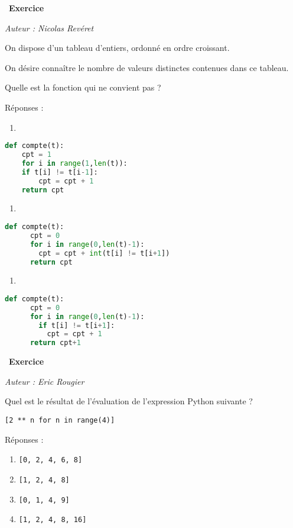 \documentclass[
  11pt,
]{article}
\newcommand{\passthrough}[1]{#1}
\providecommand{\tightlist}{%
  \setlength{\itemsep}{0pt}\setlength{\parskip}{0pt}}
\newcounter{exo}
\newenvironment{exercice}[1]
{\par \medskip   \addtocounter{exo}{1} \noindent  
\begin{bclogo}[arrondi =0.1,   noborder = true, logo=\bccrayon, marge=4]{~\textbf{Exercice} \textbf{\theexo} {\itshape #1} }  \par}
{
\end{bclogo}
 \par \bigskip }
\newcounter{def}
\begin{document}
\begin{exercice}{}

\emph{Auteur : Nicolas Revéret}

On dispose d'un tableau d'entiers, ordonné en ordre croissant.

On désire connaître le nombre de valeurs distinctes contenues dans ce
tableau.

Quelle est la fonction qui ne convient pas ?

Réponses :

\begin{enumerate}
\def\labelenumi{\Alph{enumi})}
\tightlist
\item
\end{enumerate}

\begin{lstlisting}[language=Python]
def compte(t):
    cpt = 1
    for i in range(1,len(t)):
    if t[i] != t[i-1]:
        cpt = cpt + 1
    return cpt
\end{lstlisting}

\begin{enumerate}
\def\labelenumi{\Alph{enumi})}
\setcounter{enumi}{1}
\tightlist
\item
\end{enumerate}

\begin{lstlisting}[language=Python]
    def compte(t):
      cpt = 0
      for i in range(0,len(t)-1):
        cpt = cpt + int(t[i] != t[i+1])
      return cpt
\end{lstlisting}

\begin{enumerate}
\def\labelenumi{\Alph{enumi})}
\setcounter{enumi}{2}
\tightlist
\item
\end{enumerate}

\begin{lstlisting}[language=Python]
    def compte(t):
      cpt = 0
      for i in range(0,len(t)-1):
        if t[i] != t[i+1]:
          cpt = cpt + 1
      return cpt+1
\end{lstlisting}

\end{exercice}

\begin{exercice}{}

\emph{Auteur : Eric Rougier}

Quel est le résultat de l'évaluation de l'expression Python suivante ?

\passthrough{\lstinline![2 ** n for n in range(4)]!}

Réponses :

\begin{enumerate}
\def\labelenumi{\Alph{enumi})}
\tightlist
\item
  \passthrough{\lstinline![0, 2, 4, 6, 8]!}
\item
  \passthrough{\lstinline![1, 2, 4, 8]!}
\item
  \passthrough{\lstinline![0, 1, 4, 9]!}
\item
  \passthrough{\lstinline![1, 2, 4, 8, 16]!}
\end{enumerate}

\end{exercice}
\end{document}
